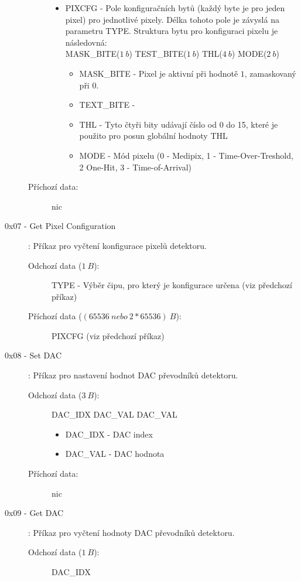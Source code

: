 \begin{description}
\begin{description}
\begin{itemize}
\begin{itemize}
						\end{itemize}
					\item PIXCFG - Pole konfiguračních bytů (každý byte je pro jeden pixel) pro jednotlivé pixely. Délka tohoto pole je závyslá na parametru TYPE. Struktura bytu pro konfiguraci pixelu je následovná: \\ MASK\_BITE($1~b$) TEST\_BITE($1~b$) THL($4~b$) MODE($2~b$)
						\begin{itemize}
							\item MASK\_BITE - Pixel je aktivní při hodnotě $1$, zamaskovaný při $0$.
							\item TEXT\_BITE - \todo
							\item THL - Tyto čtyři bity udávají číslo od 0 do 15, které je použito pro posun globální hodnoty THL
							\item MODE - Mód pixelu (0 - Medipix, 1 - Time-Over-Treshold, 2 One-Hit, 3 - Time-of-Arrival)
						\end{itemize}
				\end{itemize}
			\item[Příchozí data:] nic
		\end{description}
	\item[0x07 - Get Pixel Configuration]:
		Příkaz pro vyčtení konfigurace pixelů detektoru.
		\begin{description}
			\item[Odchozí data ($1~B$):] TYPE - Výběr čipu, pro který je konfigurace určena (viz předchozí příkaz)
			\item[Příchozí data ($(65536~nebo~2*65536)~B$):] PIXCFG (viz předchozí příkaz)
		\end{description}
	\item[0x08 - Set DAC]:
		Příkaz pro nastavení hodnot DAC převodníků detektoru.
		\begin{description}
			\item[Odchozí data ($3~B$):] DAC\_IDX DAC\_VAL DAC\_VAL
				\begin{itemize}
					\item DAC\_IDX - DAC index
					\item DAC\_VAL - DAC hodnota
				\end{itemize}
			\item[Příchozí data:] nic
		\end{description}
	\item[0x09 - Get DAC]:
		Příkaz pro vyčtení hodnoty DAC převodníků detektoru.
		\begin{description}
			\item[Odchozí data ($1~B$):] DAC\_IDX

\end{description}
\end{description}
